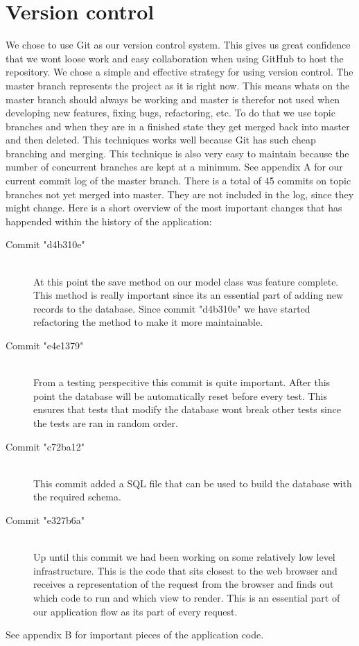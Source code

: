 \documentclass[12pt]{article}
\begin{document}
\section{Version control}
We chose to use Git as our version control system. This gives us great confidence that we wont loose work and easy collaboration when using GitHub to host the repository.
\newline
\newline
We chose a simple and effective strategy for using version control. The master branch represents the project as it is right now. This means whats on the master branch should always be working and master is therefor not used when developing new features, fixing bugs, refactoring, etc. To do that we use topic branches and when they are in a finished state they get merged back into master and then deleted. This techniques works well because Git has such cheap branching and merging. This technique is also very easy to maintain because the number of concurrent branches are kept at a minimum.
\newline
\newline
See appendix A for our current commit log of the master branch. There is a total of 45 commits on topic branches not yet merged into master. They are not included in the log, since they might change.
\newline
\newline
Here is a short overview of the most important changes that has happended within the history of the application:
\begin{description}
  \item[Commit "d4b310e"] \hfill \\
    At this point the save method on our model class was feature complete. This method is really important since its an essential part of adding new records to the database. Since commit "d4b310e" we have started refactoring the method to make it more maintainable.
  \item[Commit "e4e1379"] \hfill \\
    From a testing perspecitive this commit is quite important. After this point the database will be automatically reset before every test. This ensures that tests that modify the database wont break other tests since the tests are ran in random order.
  \item[Commit "c72ba12"] \hfill \\
    This commit added a SQL file that can be used to build the database with the required schema.
  \item[Commit "e327b6a"] \hfill \\
    Up until this commit we had been working on some relatively low level infrastructure. This is the code that sits closest to the web browser and receives a representation of the request from the browser and finds out which code to run and which view to render. This is an essential part of our application flow as its part of every request.
\end{description}
See appendix B for important pieces of the application code.
\end{document}
